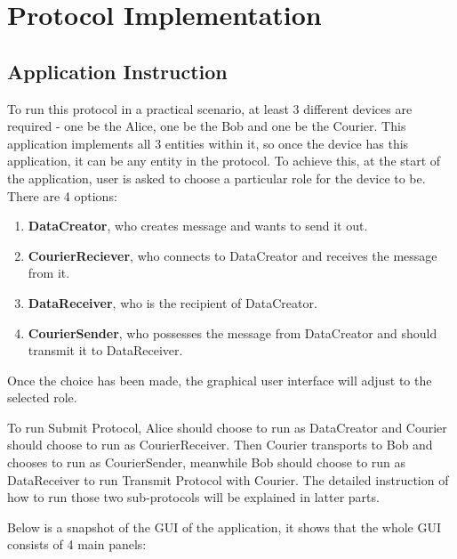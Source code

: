 \section*{Protocol Implementation}
\subsection{Application Instruction}
To run this protocol in a practical scenario, at least 3 different devices are required - one be the Alice, one be the Bob and one be the Courier. This application implements all 3 entities within it, so once the device has this application, it can be any entity in the protocol. To achieve this, at the start of the application, user is asked to choose a particular role for the device to be. There are 4 options:
\begin{enumerate}
\item \textbf{DataCreator}, who creates message and wants to send it out.
\item \textbf{CourierReciever}, who connects to DataCreator and receives the message from it.
\item \textbf{DataReceiver}, who is the recipient of DataCreator.
\item \textbf{CourierSender}, who possesses the message from DataCreator and should transmit it to DataReceiver.
\end{enumerate}
Once the choice has been made, the graphical user interface will adjust to the selected role. \par
To run Submit Protocol, Alice should choose to run as DataCreator and Courier should choose to run as CourierReceiver. Then Courier transports to Bob and chooses to run as CourierSender, meanwhile Bob should choose to run as DataReceiver to run Transmit Protocol with Courier. The detailed instruction of how to run those two sub-protocols will be explained in latter parts. \par
Below is a snapshot of the GUI of the application, it shows that the whole GUI consists of 4 main panels:

